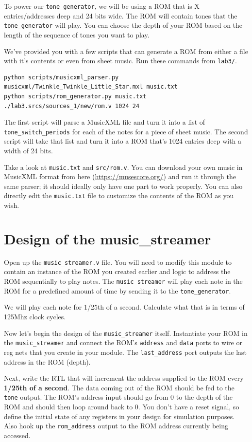 \documentclass[11pt]{article}
\begin{document}
To power our \verb|tone_generator|, we will be using a ROM that is X entries/addresses deep and 24 bits wide. The ROM will contain tones that the \verb|tone_generator| will play. You can choose the depth of your ROM based on the length of the sequence of tones you want to play.

We've provided you with a few scripts that can generate a ROM from either a file with it's contents or even from sheet music. Run these commands from \verb|lab3/|.

\begin{verbatim}
python scripts/musicxml_parser.py musicxml/Twinkle_Twinkle_Little_Star.mxl music.txt
python scripts/rom_generator.py music.txt ./lab3.srcs/sources_1/new/rom.v 1024 24
\end{verbatim}

The first script will parse a MusicXML file and turn it into a list of \verb|tone_switch_periods| for each of the notes for a piece of sheet music. The second script will take that list and turn it into a ROM that's 1024 entries deep with a width of 24 bits.

Take a look at \verb|music.txt| and \verb|src/rom.v|. You can download your own music in MusicXML format from here (\url{https://musescore.org/}) and run it through the same parser; it should ideally only have one part to work properly. You can also directly edit the \verb|music.txt| file to customize the contents of the ROM as you wish.

\section{Design of the music\_streamer}
Open up the \verb|music_streamer.v| file. You will need to modify this module to contain an instance of the ROM you created earlier and logic to address the ROM sequentially to play notes. The \verb|music_streamer| will play each note in the ROM for a predefined amount of time by sending it to the \verb|tone_generator|. 

We will play each note for 1/25th of a second. Calculate what that is in terms of 125Mhz clock cycles.

Now let's begin the design of the \verb|music_streamer| itself. Instantiate your ROM in the \verb|music_streamer| and connect the ROM's \verb|address| and \verb|data| ports to wire or reg nets that you create in your module.  The \verb|last_address| port outputs the last address in the ROM (depth).

Next, write the RTL that will increment the address supplied to the ROM every \textbf{1/25th of a second}. The data coming out of the ROM should be fed to the \verb|tone| output. The ROM's address input should go from 0 to the depth of the ROM and should then loop around back to 0. You don't have a reset signal, so define the initial state of any registers in your design for simulation purposes. Also hook up the \verb|rom_address| output to the ROM address currently being accessed.
\end{document}
